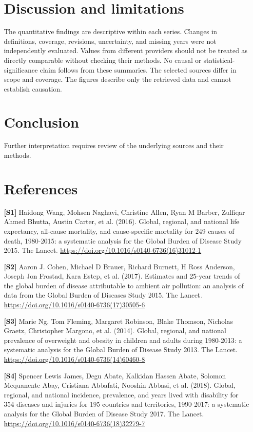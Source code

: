 \documentclass[10pt,a4paper]{article}
\begin{document}
\section{Discussion and limitations}
The quantitative findings are descriptive within each series. Changes in definitions, coverage, revisions, uncertainty, and missing years were not independently evaluated. Values from different providers should not be treated as directly comparable without checking their methods. No causal or statistical-significance claim follows from these summaries.
The selected sources differ in scope and coverage. The figures describe only the retrieved data and cannot establish causation.
\section{Conclusion}
Further interpretation requires review of the underlying sources and their methods.
\section*{References}
\noindent\textbf{[S1]} Haidong Wang, Mohsen Naghavi, Christine Allen, Ryan M Barber, Zulfiqar Ahmed Bhutta, Austin Carter, et al. (2016). Global, regional, and national life expectancy, all-cause mortality, and cause-specific mortality for 249 causes of death, 1980-2015: a systematic analysis for the Global Burden of Disease Study 2015. The Lancet. \url{https://doi.org/10.1016/s0140-6736(16)31012-1}\par

\noindent\textbf{[S2]} Aaron J. Cohen, Michael D Brauer, Richard Burnett, H Ross Anderson, Joseph Jon Frostad, Kara Estep, et al. (2017). Estimates and 25-year trends of the global burden of disease attributable to ambient air pollution: an analysis of data from the Global Burden of Diseases Study 2015. The Lancet. \url{https://doi.org/10.1016/s0140-6736(17)30505-6}\par

\noindent\textbf{[S3]} Marie Ng, Tom Fleming, Margaret Robinson, Blake Thomson, Nicholas Graetz, Christopher Margono, et al. (2014). Global, regional, and national prevalence of overweight and obesity in children and adults during 1980-2013: a systematic analysis for the Global Burden of Disease Study 2013. The Lancet. \url{https://doi.org/10.1016/s0140-6736(14)60460-8}\par

\noindent\textbf{[S4]} Spencer Lewis James, Degu Abate, Kalkidan Hassen Abate, Solomon Mequanente Abay, Cristiana Abbafati, Nooshin Abbasi, et al. (2018). Global, regional, and national incidence, prevalence, and years lived with disability for 354 diseases and injuries for 195 countries and territories, 1990-2017: a systematic analysis for the Global Burden of Disease Study 2017. The Lancet. \url{https://doi.org/10.1016/s0140-6736(18)32279-7}\par
\end{document}
